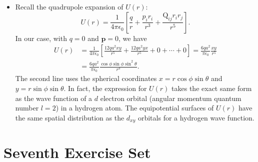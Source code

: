 \documentclass[11pt, a4paper]{article}
\renewcommand{\vec}[1]{\bm{#1}} %
\newcommand{\ee}{\epsilon_{0}}  %
\begin{document}
\begin{itemize}
	\item Recall the quadrupole expansion of $ U(r) $:
	\begin{equation*}
		U(r) = \frac{1}{4\pi \ee} \left[\frac{q}{r} + \frac{p_{i}r_{i}}{r^{3}} + \frac{\mathrm{Q}_{ij}r_{i}r_{j}}{r^{5}} \right].
	\end{equation*}
	In our case, with $ q = 0 $ and $ \vec{p} = 0 $, we have
	\begin{align*}
		U(r) &= \frac{1}{4\pi \ee} \left[\frac{12qa^{2}xy}{r^{5}} + \frac{12qa^{2}yx}{r^{5}} + 0 + \cdots + 0\right] = \frac{6qa^{2}}{\pi \ee} \frac{xy}{r^{5}}\\
		&=\frac{6qa^{2}}{\pi \ee} \frac{\cos \phi \sin \phi \sin^{2}\theta}{r^{3}}.
	\end{align*}
	The second line uses the spherical coordinates $ x = r\cos \phi \sin \theta $ and $ y = r\sin \phi \sin \theta $. In fact, the expression for $ U(r) $ takes the exact same form as the wave function of a $ d $ electron orbital (angular momentum quantum number $ l = 2 $) in a hydrogen atom. The equipotential surfaces of $ U(r) $ have the same spatial distribution as the $ d_{xy} $  orbitals for a hydrogen wave function. 
	
\end{itemize}


\section{Seventh Exercise Set}
\end{document}

